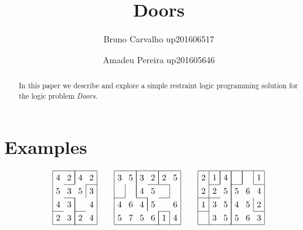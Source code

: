 \documentclass[runningheads]{llncs}
\newcommand*{\cc}[2]{\multicolumn{1}{#1}{#2}}
\begin{document}
%
\title{Doors}
%
%
\author{Bruno Carvalho up201606517 \and Amadeu Pereira up201605646}
%
%

\maketitle

\begin{abstract}
In this paper we describe and explore a simple restraint logic programming solution for the logic problem \textit{Doors}.

\end{abstract}

\section{Examples}

\begin{equation*}
\arraycolsep=4.0pt\def\arraystretch{1.3}
\begin{array}[c]{|c c c c|}
\hline
4 & \cc{ c|}{2} & \cc{|c }{4} & 2\\
\cline{2-2}\cline{4-4}
5 & \cc{ c }{3} & \cc{ c|}{5} & 3\\
\cline{2-2}
4 & \cc{ c|}{3} & \cc{|c }{ } & 4\\
\cline{1-1}\cline{3-3}
2 & \cc{ c|}{3} & \cc{|c }{2} & 4\\
\hline
\end{array}
\qquad
\begin{array}[c]{|c c c c c c|}
\hline
3 & \cc{ c|}{5} & \cc{|c }{3} & \cc{ c|}{2} & \cc{|c }{2} & 5\\
\cline{4-5}
  & \cc{|c|}{ } & \cc{|c }{4} & \cc{ c }{5} & \cc{ c|}{ } &  \\
\cline{1-1}\cline{3-3}\cline{5-5}
4 & \cc{ c }{6} & \cc{ c|}{4} & \cc{|c }{5} & \cc{ c }{ } & 6\\
\cline{5-5}
5 & \cc{ c }{7} & \cc{ c }{5} & \cc{ c|}{6} & \cc{|c|}{1} & 4\\
\hline
\end{array}
\qquad
\begin{array}[c]{|c c c c c c|}
\hline
2 & \cc{|c|}{1} & \cc{|c|}{4} & \cc{|c|}{ } & \cc{|c|}{ } & 1\\
\cline{2-2}\cline{4-4}\cline{6-6}
2 & \cc{|c }{2} & \cc{ c|}{5} & \cc{|c }{5} & \cc{ c }{6} & 4\\
\cline{1-2}
1 & \cc{|c }{3} & \cc{ c|}{5} & \cc{|c }{4} & \cc{ c|}{5} & 2\\
\cline{1-1}\cline{6-6}
  & \cc{|c }{3} & \cc{ c|}{5} & \cc{|c }{5} & \cc{ c }{6} & 3\\
\hline
\end{array}
\end{equation*}
\end{document}
